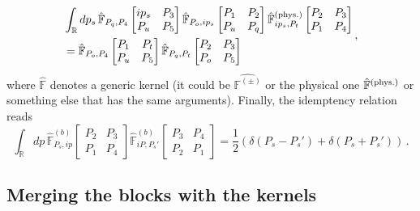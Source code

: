 \documentclass[11pt]{article}
\begin{document}
\begin{equation}\label{eq:Pentagoninlittlepgenericrelation}
    \begin{aligned}
        &\int_{\mathbb{R}} dp_s \, \hat{\mathbb{F}}_{P_q, P_4} 
    \begin{bmatrix}
     ip_s & P_3 \\
     P_u & P_5
     \end{bmatrix}
\hat{\mathbb{F}}_{P_o, ip_s} 
    \begin{bmatrix}
     P_1 & P_2 \\
     P_u & P_q
     \end{bmatrix}
\hat{\mathbb{F}}^{(\rm {phys.})}_{ip_s, P_t} 
    \begin{bmatrix}
     P_2 & P_3 \\
     P_1 & P_4
     \end{bmatrix}\\
&= \hat{\mathbb{F}}_{P_o, P_4} 
    \begin{bmatrix}
     P_1 & P_t \\
     P_u & P_5
     \end{bmatrix}
\hat{\mathbb{F}}_{P_q, P_t} 
    \begin{bmatrix}
     P_2 & P_3 \\
     P_o & P_5
     \end{bmatrix}
    \end{aligned}\,,
\end{equation}
where $\hat{\mathbb{F}}$ denotes a generic kernel (it could be $\hat{\mathbb{F}^{(\pm)}}$ or the physical one $\hat{\mathbb{F}}^{(\rm {phys.})}$ or something else that has the same arguments).
Finally, the idemptency relation reads
\begin{equation}\label{eq:idempotencyf}
    \int_{\mathbb{R}} dp \,\hat{\mathbb{F}}^{(b)}_{P_s, ip} \begin{bmatrix}
     P_2 & P_3 \\
     P_1 & P_4
    \end{bmatrix}
    \hat{\mathbb{F}}^{(b)}_{iP, P_s'} \begin{bmatrix}
     P_3 & P_4 \\
     P_2 & P_1
    \end{bmatrix}
    = \frac{1}{2} \left(\delta(P_s - P_s')+\delta(P_s+P_s')\right)\,.
\end{equation}

\subsection{Merging the blocks with the kernels}
\end{document}
